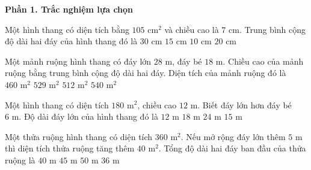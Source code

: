 \textbf{Phần 1. Trắc nghiệm lựa chọn}

\begin{ex} %
Một hình thang có diện tích bằng $105\text{ cm}^2$ và chiều cao là $7\text{ cm}$. Trung bình cộng độ dài hai đáy của hình thang đó là
\choice
{$30\text{ cm}$}
{\True $15\text{ cm}$}
{$10\text{ cm}$}
{$20\text{ cm}$}
\end{ex}

\begin{ex} %
Một mảnh ruộng hình thang có đáy lớn $28\text{ m}$, đáy bé $18\text{ m}$. Chiều cao của mảnh ruộng bằng trung bình cộng độ dài hai đáy. Diện tích của mảnh ruộng đó là
\choice
{$460\text{ m}^2$}
{\True $529\text{ m}^2$}
{$512\text{ m}^2$}
{$540\text{ m}^2$}
\end{ex}

\begin{ex} %
Một hình thang có diện tích $180\text{ m}^2$, chiều cao $12\text{ m}$. Biết đáy lớn hơn đáy bé $6\text{ m}$. Độ dài đáy lớn của hình thang đó là
\choice
{$12\text{ m}$}
{\True $18\text{ m}$}
{$24\text{ m}$}
{$15\text{ m}$}
\end{ex}

\begin{ex} %
Một thửa ruộng hình thang có diện tích $360\text{ m}^2$. Nếu mở rộng đáy lớn thêm $5\text{ m}$ thì diện tích thửa ruộng tăng thêm $40\text{ m}^2$. Tổng độ dài hai đáy ban đầu của thửa ruộng là
\choice
{$40\text{ m}$}
{\True $45\text{ m}$}
{$50\text{ m}$}
{$36\text{ m}$}
\end{ex}

